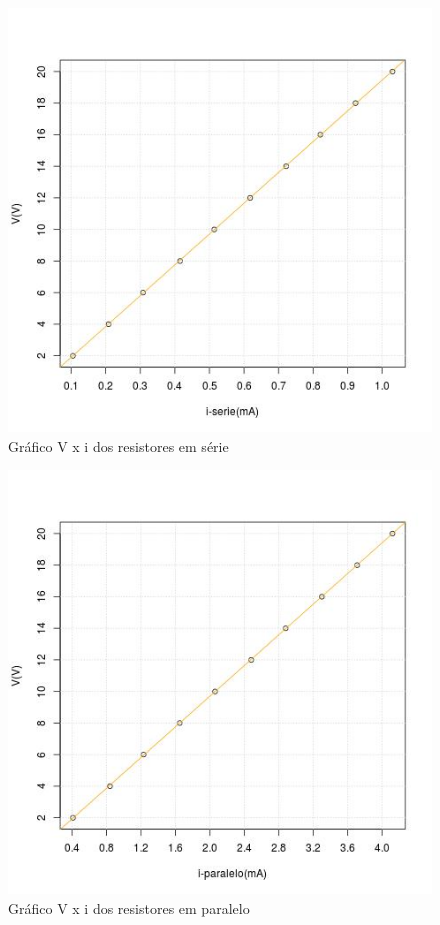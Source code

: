 \documentclass[11pt,a4paper]{article}
\begin{document}
    \begin{figure}[htb!]
      \centering
      \captionsetup{justification=centering}  
      \includegraphics[scale=0.7]{Vis}
      \caption{Gráfico V x i dos resistores em série}
      \label{fig:is}
    \end{figure}
    
    \begin{figure}[htb!]
      \centering
      \captionsetup{justification=centering}  
      \includegraphics[scale=0.7]{Vip}
      \caption{Gráfico V x i dos resistores em paralelo}
      \label{fig:ip}
    \end{figure}
    
\end{document}
